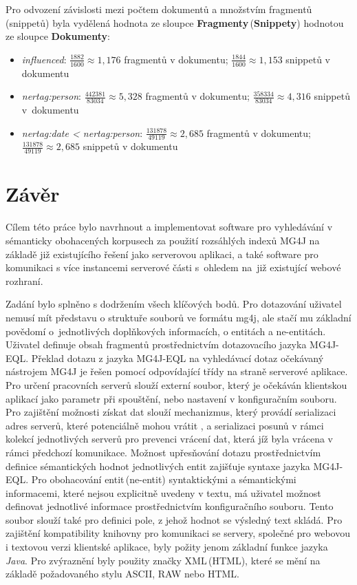 Pro odvození závislosti mezi počtem dokumentů a množstvím fragmentů\,(snippetů) byla vydělená hodnota ze sloupce \textbf{Fragmenty}\,(\textbf{Snippety}) hodnotou ze sloupce \textbf{Dokumenty}:
\begin{itemize}
\item \emph{influenced}: $\frac{1882}{1600} \approx 1,176$ fragmentů v dokumentu; $\frac{1844}{1600} \approx 1,153$ snippetů v dokumentu

\item \emph{nertag:person}: $\frac{442381}{83034} \approx 5,328$ fragmentů v dokumentu; $\frac{358334}{83034} \approx 4,316$ snippetů v~dokumentu

\item \emph{nertag:date < nertag:person}: $\frac{131878}{49119} \approx 2,685$ fragmentů v dokumentu; $\frac{131878}{49119} \approx 2,685$ snippetů v dokumentu
\end{itemize}


\chapter{Závěr}
\label{chapter8}

Cílem této práce bylo navrhnout a implementovat software pro vyhledávání v sémanticky obohacených korpusech za použití rozsáhlých indexů MG4J na základě již existujícího řešení jako serverovou aplikaci, a také software pro komunikaci s více instancemi serverové části s~ohledem na~již existující webové rozhraní.

Zadání bylo splněno s dodržením všech klíčových bodů. Pro dotazování uživatel nemusí mít představu o struktuře souborů ve formátu mg4j, ale stačí mu základní povědomí o~jednotlivých doplňkových informacích, o entitách a ne-entitách. Uživatel definuje obsah fragmentů prostřednictvím dotazovacího jazyka MG4J-EQL. Překlad dotazu z jazyka MG4J-EQL na vyhledávací dotaz očekávaný nástrojem MG4J je řešen pomocí odpovídající třídy na straně serverové aplikace. Pro určení pracovních serverů slouží externí soubor, který je očekáván klientskou aplikací jako parametr při spouštění, nebo nastavení v konfiguračním souboru. Pro zajištění možnosti získat  dat slouží mechanizmus, který provádí serializaci adres serverů, které potenciálně mohou vrátit , a serializaci posunů v rámci kolekcí jednotlivých serverů pro prevenci vrácení dat, která jíž byla vrácena v rámci předchozí komunikace. Možnost upřesňování dotazu prostřednictvím definice sémantických hodnot jednotlivých entit zajišťuje syntaxe jazyka MG4J-EQL. Pro obohacování entit\,(ne-entit) syntaktickými a sémantickými informacemi, které nejsou explicitně uvedeny v textu, má uživatel možnost definovat jednotlivé informace prostřednictvím konfiguračního souboru. Tento soubor slouží také pro definici pole, z jehož hodnot se výsledný text skládá. Pro zajištění kompatibility knihovny pro komunikaci se servery, společné pro webovou i textovou verzi klientské aplikace, byly požity jenom základní funkce jazyka \emph{Java}. Pro zvýraznění byly použity značky XML\,(HTML), které se mění na základě požadovaného stylu ASCII, RAW nebo HTML.

